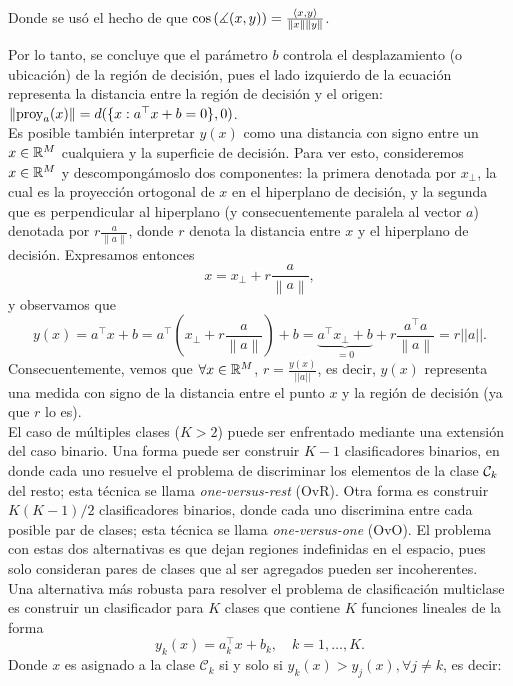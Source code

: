 Donde se usó el hecho de que $\cos\left(\measuredangle(x,y)\right) = \frac{\langle x,y\rangle}{\left\lVert x\right\rVert\left\lVert y\right\rVert}$.


Por lo tanto, se concluye que el parámetro $b$ controla el desplazamiento (o ubicación) de la región de decisión,  pues el lado izquierdo de la ecuación representa la distancia entre la región de decisión y el origen: $\left\lVert\text{proy}_a(x)\right\rVert = d(\{x:a^\top x+b = 0\},0)$.\\

Es posible  también interpretar $y(x)$ como una distancia con signo entre un $x\in\mathbb{R}^M$ cualquiera  y la superficie de decisión. Para ver esto, consideremos $x\in\mathbb{R}^M$ y descompongámoslo dos componentes: la primera denotada por $x_{\bot}$, la cual es la proyección ortogonal de $x$ en el hiperplano de  decisión, y la segunda que es perpendicular al hiperplano (y consecuentemente paralela al vector $a$) denotada por $r\frac{a}{\left \| a \right \|}$, donde $r$ denota la distancia entre $x$ y el  hiperplano de  decisión. Expresamos entonces  
\begin{equation}
	x = x_{\bot}+r\frac{a}{\left \| a \right \|},
\end{equation}
y observamos que
\begin{equation}
	y(x) 
	= a^\top x+b 
	=a^\top  \left( x_{\bot} + r\frac{a}{\left \| a \right \|} \right) +b 
	= \underbrace{a^\top x_{\bot} +b }_{=0} +   r\frac{a^\top  a}{\left \| a \right \|}
	= r||a||.
\end{equation}
Consecuentemente, vemos que $\forall x\in\mathbb{R}^M$, $r = \frac{y(x)}{||a||}$,  es decir, $y(x)$ representa una medida con signo de la  distancia entre el punto $x$ y la  región de decisión (ya que $r$ lo es).\\

El caso de múltiples clases ($K>2$) puede ser enfrentado mediante una extensión del caso binario. Una forma puede ser construir $K-1$ clasificadores binarios, en donde cada uno  resuelve el problema de discriminar los elementos de la  clase ${\mathcal C}_k$ del resto; esta técnica se llama \emph{one-versus-rest} (OvR). Otra forma es construir $K(K-1)/2$ clasificadores binarios, donde cada uno discrimina entre cada posible par de clases; esta técnica se llama \emph{one-versus-one} (OvO). El problema con estas dos alternativas es que dejan  regiones indefinidas en el espacio, pues solo consideran pares de clases que  al ser agregados pueden ser incoherentes. \\

Una alternativa más robusta para resolver el problema de clasificación multiclase es construir un clasificador para $K$ clases que contiene $K$ funciones lineales de la forma
\begin{equation}
	y_k(x) = a_k^\top x + b_k, \quad k=1,\ldots,K.
\end{equation}
Donde $x$ es asignado a la clase $\mathcal{C}_k$ si y solo si $y_k(x) > y_j(x), \forall j\neq k$, es decir:

